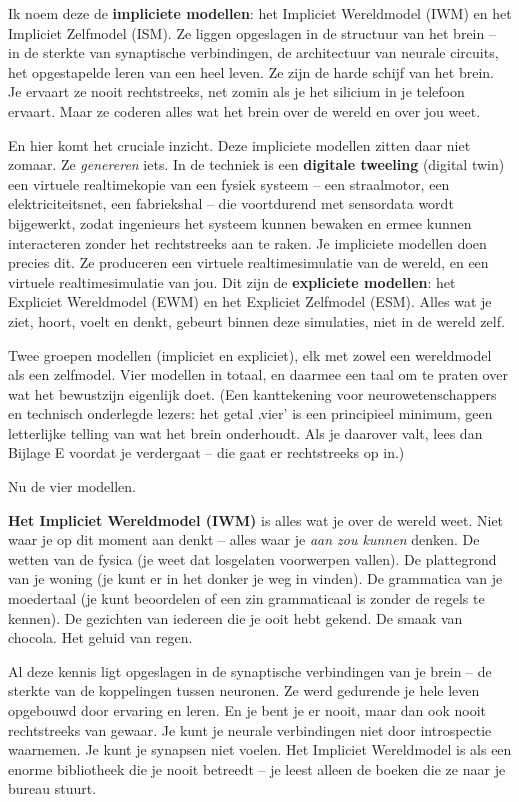 \documentclass[11pt, twoside, openright]{book}
\begin{document}
Ik noem deze de \textbf{impliciete modellen}: het Impliciet Wereldmodel (IWM) en het Impliciet Zelfmodel (ISM). Ze liggen opgeslagen in de structuur van het brein -- in de sterkte van synaptische verbindingen, de architectuur van neurale circuits, het opgestapelde leren van een heel leven. Ze zijn de harde schijf van het brein. Je ervaart ze nooit rechtstreeks, net zomin als je het silicium in je telefoon ervaart. Maar ze coderen alles wat het brein over de wereld en over jou weet.

En hier komt het cruciale inzicht. Deze impliciete modellen zitten daar niet zomaar. Ze \textit{genereren} iets. In de techniek is een \textbf{digitale tweeling} (digital twin) een virtuele realtimekopie van een fysiek systeem -- een straalmotor, een elektriciteitsnet, een fabriekshal -- die voortdurend met sensordata wordt bijgewerkt, zodat ingenieurs het systeem kunnen bewaken en ermee kunnen interacteren zonder het rechtstreeks aan te raken. Je impliciete modellen doen precies dit. Ze produceren een virtuele realtimesimulatie van de wereld, en een virtuele realtimesimulatie van jou. Dit zijn de \textbf{expliciete modellen}: het Expliciet Wereldmodel (EWM) en het Expliciet Zelfmodel (ESM). Alles wat je ziet, hoort, voelt en denkt, gebeurt binnen deze simulaties, niet in de wereld zelf.

Twee groepen modellen (impliciet en expliciet), elk met zowel een wereldmodel als een zelfmodel. Vier modellen in totaal, en daarmee een taal om te praten over wat het bewustzijn eigenlijk doet. (Een kanttekening voor neurowetenschappers en technisch onderlegde lezers: het getal ‚vier' is een principieel minimum, geen letterlijke telling van wat het brein onderhoudt. Als je daarover valt, lees dan Bijlage E voordat je verdergaat -- die gaat er rechtstreeks op in.)

Nu de vier modellen.

\textbf{Het Impliciet Wereldmodel (IWM)} is alles wat je over de wereld weet. Niet waar je op dit moment aan denkt -- alles waar je \textit{aan zou kunnen} denken. De wetten van de fysica (je weet dat losgelaten voorwerpen vallen). De plattegrond van je woning (je kunt er in het donker je weg in vinden). De grammatica van je moedertaal (je kunt beoordelen of een zin grammaticaal is zonder de regels te kennen). De gezichten van iedereen die je ooit hebt gekend. De smaak van chocola. Het geluid van regen.

Al deze kennis ligt opgeslagen in de synaptische verbindingen van je brein -- de sterkte van de koppelingen tussen neuronen. Ze werd gedurende je hele leven opgebouwd door ervaring en leren. En je bent je er nooit, maar dan ook nooit rechtstreeks van gewaar. Je kunt je neurale verbindingen niet door introspectie waarnemen. Je kunt je synapsen niet voelen. Het Impliciet Wereldmodel is als een enorme bibliotheek die je nooit betreedt -- je leest alleen de boeken die ze naar je bureau stuurt.
\end{document}
